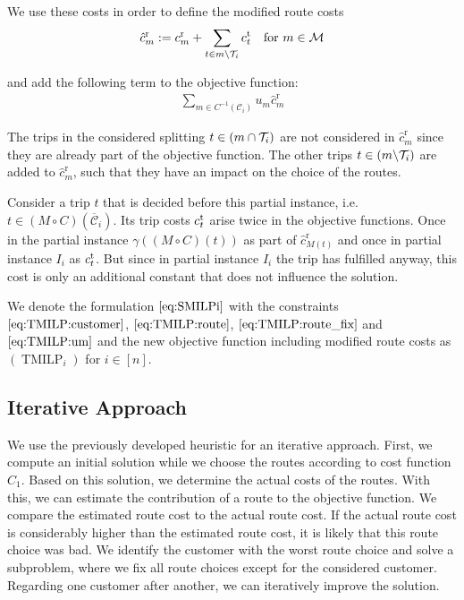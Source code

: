 We use these costs in order to define the modified route costs
\begin{align*}
	\hat{c}^{\operatorname{r}}_m := c^{\operatorname{r}}_m + \sum_{t\in m\backslash\mathcal{T}_i}c^{\operatorname{t}}_t && \text{for } m\in\mathcal{M}
\end{align*}

and add the following term to the objective function:
\begin{align*}
	\sum_{m\in C^{-1}\left(\mathcal{C}_i\right)} u_m \hat{c}^{\operatorname{r}}_m
\end{align*}

\begin{remark}

The trips in the considered splitting $t\in \left(m\cap\mathcal{T}_i\right)$ are not considered in $\hat{c}^{\operatorname{r}}_m$ since they are already part of the objective function. The other trips $t\in\left(m\backslash\mathcal{T}_i\right)$ are added to $\hat{c}^{\operatorname{r}}_m$, such that they have an impact on the choice of the routes.

Consider a trip $t$ that is decided before this partial instance, i.e. $t\in(M\circ C)\left(\overline{\mathcal{C}}_i\right)$. Its trip costs $c^{\operatorname{t}}_t$ arise twice in the objective functions. Once in the partial instance $\gamma\left((M\circ C)(t)\right)$ as part of $\hat{c}^{\operatorname{r}}_{M(t)}$ and once in partial instance $I_i$ as $c^{\operatorname{t}}_t$. But since in partial instance $I_i$ the trip has fulfilled anyway, this cost is only an additional constant that does not influence the solution. 

\end{remark}

We denote the formulation $\eqref{eq:SMILPi}$ with the constraints $\eqref{eq:TMILP:customer}$, $\eqref{eq:TMILP:route}$, $\eqref{eq:TMILP:route_fix}$ and $\eqref{eq:TMILP:um}$ and the new objective function including modified route costs as $(\operatorname{TMILP}_i)$ for $i\in[n]$.


\subsection{Iterative Approach}
\label{sec:iterative_approach}

We use the previously developed heuristic for an iterative approach. First, we compute an initial solution while we choose the routes according to cost function $C_1$. Based on this solution, we determine the actual costs of the routes. With this, we can estimate the contribution of a route to the objective function. We compare the estimated route cost to the actual route cost. If the actual route cost is considerably higher than the estimated route cost, it is likely that this route choice was bad. We identify the customer with the worst route choice and solve a subproblem, where we fix all route choices except for the considered customer. Regarding one customer after another, we can iteratively improve the solution.

